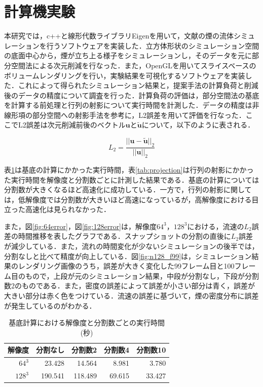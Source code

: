 \documentclass[uplatex,dvipdfmx,10pt,a4paper,notitlepage,oneside,twocolumn]{abst_jsarticle}
\begin{document}
\section{計算機実験}
本研究では，c++と線形代数ライブラリEigenを用いて，文献\cite{fedkiw}の煙の流体シミュレーションを行うソフトウェアを実装した．立方体形状のシミュレーション空間の底面中心から，煙が立ち上る様子をシミュレーションし，そのデータを元に部分空間法による次元削減を行なった．また，OpenGLを用いてスライスベースのボリュームレンダリングを行い，実験結果を可視化するソフトウェアを実装した．これによって得られたシミュレーション結果と，提案手法の計算負荷と削減後のデータの精度について調査を行った．計算負荷の評価は，部分空間法の基底を計算する前処理と行列の射影について実行時間を計測した．データの精度は非線形項の部分空間への射影手法\cite{projection_base}を参考に，L2誤差を用いて評価を行なった．ここでL2誤差は次元削減前後のベクトル$\bm{u}$と$\bm{\tilde{u}}$について，以下のように表される．

\[
L_2 = \frac{|| \bm{u} - \bm{\tilde{u}} ||_2}{||  \bm{u} ||_2}
\]

表\ref{tab:basis}は基底の計算にかかった実行時間，表\ref{tab:projection}は行列の射影にかかった実行時間を解像度と分割数ごとに計測した結果である．基底の計算については分割数が大きくなるほど高速化に成功している．一方で，行列の射影に関しては，低解像度では分割数が大きいほど高速になっているが，高解像度における目立った高速化は見られなかった．

また，図\ref{fig:64error}，図\ref{fig:128error}は，解像度$64^3$，$128^3$における，流速の$L_2$誤差の時間推移を表したグラフである．スナップショットの分割の直後に$L_2$誤差が減少している．また，流れの時間変化が少ないシミュレーションの後半では，分割なしと比べて精度が向上している．図\ref{fig:n128_f99}は，シミュレーション結果のレンダリング画像のうち，誤差が大きく変化した99フレーム目と100フレーム目のもので，上段が元のシミュレーション結果，中段が分割なし，下段が分割数2のものである．また，密度の誤差によって誤差が小さい部分は青く，誤差が大きい部分は赤く色をつけている．流速の誤差に基づいて，煙の密度分布に誤差が発生しているのがわかる．

\begin {table}[htbp]
    \centering
  \caption{基底計算における解像度と分割数ごとの実行時間(秒)}
  \label{tab:basis}
  \begin {tabular}{rrrrr} \hline
    \multicolumn{1}{c}{解像度} 					&\multicolumn{1}{c}{分割なし} 		&\multicolumn{1}{c}{分割数2}			&\multicolumn{1}{c}{分割数4} 		&\multicolumn{1}{c}{分割数10}\\ \hline
    $64^3$ 					& 23.428 			&14.564	 		&8.981	 	&3.780\\
    $128^3$ 				& 190.541 		&118.489 			& 69.615 		&33.427\\ \hline
  \end {tabular}
\end {table}
\end{document}
